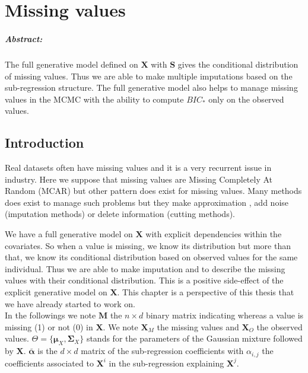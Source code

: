 \documentclass[12pt,a4paper]{report}
\begin{document}
\FloatBarrier

\chapter{Missing values} \label{chapmiss}
	\paragraph{Abstract:} The full generative model defined on $\boldsymbol{X}$ with $\boldsymbol{S}$ gives the conditional distribution of missing values. Thus we are able to make multiple imputations based on the sub-regression structure. The full generative model also helps to manage missing values in the MCMC with the ability to compute $BIC_*$ only on the observed values. 
	
	 \section{Introduction}
	Real datasets often have missing values and it is a very recurrent issue in industry. 
			Here we suppose that missing values are Missing Completely At Random (MCAR) but other pattern does exist for missing values.
	 Many methods does exist to manage such problems \cite{little1992regression} but they make approximation , add noise (imputation methods) or delete information (cutting methods).	
	 
%	 
%	 
	We have a full generative model on $\boldsymbol{X}$ with explicit dependencies within the covariates. So when a value is missing, we know its distribution but more than that, we know its conditional distribution based on observed values for the same individual. Thus we are able to make imputation and to describe the missing values with their conditional distribution. This is a positive side-effect of the explicit generative model on $\boldsymbol{X}$.
	This chapter is a perspective of this thesis that we have already started to work on.
	\\
	
	In the followings we note $\boldsymbol{M}$ the $n\times d$ binary matrix indicating whereas a value is missing (1) or not (0) in $\boldsymbol{X}$.
	We note $\boldsymbol{X}_M$ the missing values and $\boldsymbol{X}_{O}$ the observed values. $\Theta=\{\boldsymbol{\mu}_X,\boldsymbol{\Sigma}_X \}$ stands for the parameters of the Gaussian mixture followed by $\boldsymbol{X}$.
	$\bar{\boldsymbol{\alpha}}$ is the $d\times d$ matrix of the sub-regression coefficients with $\alpha_{i,j}$ the coefficients associated to $\boldsymbol{X}^i$ in the sub-regression explaining $\boldsymbol{X}^j$.\\  
\end{document}
